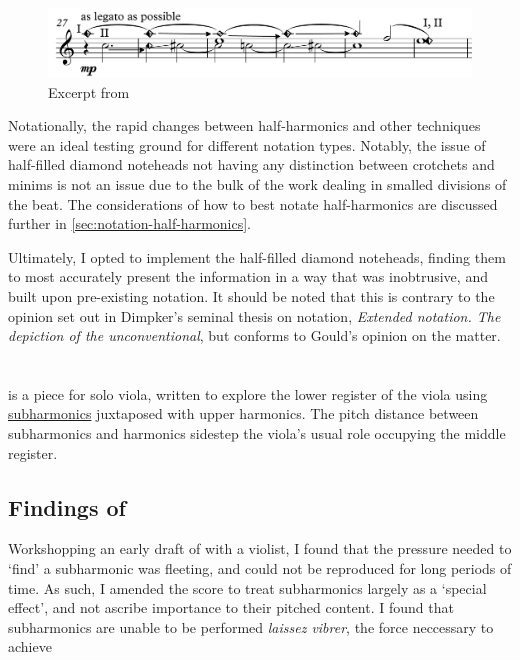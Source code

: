 \begin{figure}
    \includegraphics[width=\linewidth]{./resources/violinHalfHarmonicsExcerpt27.pdf}
    \caption{Excerpt from \violinPiece} \label{fig:violinHalfHarmonicsExcerpt27}
  \end{figure}

Notationally, the rapid changes between half-harmonics and other techniques were an ideal testing ground for different notation types. 
Notably, the issue of half-filled diamond noteheads not having any distinction between crotchets and minims is not an issue due to the bulk of the work dealing in smalled divisions of the beat.
The considerations of how to best notate half-harmonics are discussed further in \autoref{sec:notation-half-harmonics}.

Ultimately, I opted to implement the half-filled diamond noteheads, finding them to most accurately present the information in a way that was inobtrusive, and built upon pre-existing notation.
It should be noted that this is contrary to the opinion set out in Dimpker's seminal thesis on notation, \emph{Extended notation. The depiction of the
unconventional}, but conforms to Gould's opinion on the matter.\autocites[120-121]{dimpkerExtendedNotationDepiction2012}[61]{gouldBars2011}


\section{\violaPiece} \label{sec:violaPiece}
\violaPiece is a piece for solo viola, written to explore the lower register of the viola using \hyperref[sec:subharmonicsDiscussion]{subharmonics} juxtaposed with upper harmonics. 
The pitch distance between subharmonics and harmonics sidestep the viola's usual role occupying the middle register.



\subsection{Findings of \violaPiece}
Workshopping an early draft of \violaPiece with a violist, I found that the pressure needed to `find' a subharmonic was fleeting, and could not be reproduced for long periods of time.
As such, I amended the score to treat subharmonics largely as a `special effect', and not ascribe importance to their pitched content.
I found that subharmonics are unable to be performed \emph{laissez vibrer}, the force neccessary to achieve 


